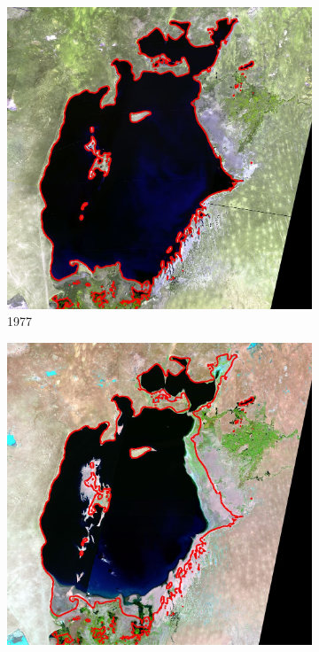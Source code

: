 \documentclass[12pt,a4paper]{article}
\begin{document}
\begin{figure}[H]
    \centering
    \begin{subfigure}[b]{0.19\textwidth}
        \centering
        \includegraphics[width=\textwidth]{../img/1977o.jpg}
        \caption{1977}
    \end{subfigure}
    \begin{subfigure}[b]{0.19\textwidth}
        \centering
        \includegraphics[width=\textwidth]{../img/1987o.jpg}

\end{subfigure}
\end{figure}
\end{document}
